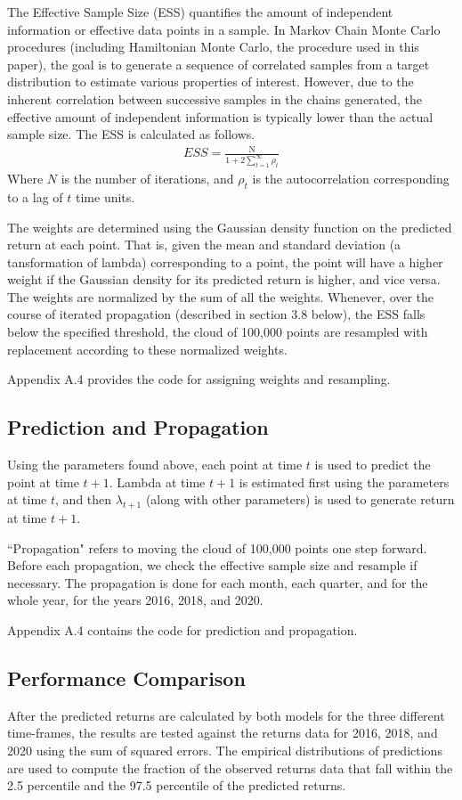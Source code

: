 \documentclass[12pt,letterpaper,reqno,fleqn]{article}
\begin{document}
The Effective Sample Size (ESS) quantifies the amount of independent information or effective data points in a sample. In Markov Chain Monte Carlo procedures (including Hamiltonian Monte Carlo, the procedure used in this paper), the goal is to generate a sequence of correlated samples from a target distribution to estimate various properties of interest. However, due to the inherent correlation between successive samples in the chains generated, the effective amount of independent information is typically lower than the actual sample size. The ESS is calculated as follows. 
\begin{align}
ESS = \frac{\text{N}}{1 + 2\sum_{t=1}^{\infty}\rho_t}
\end{align}
Where $N$ is the number of iterations, and $\rho_t$ is the autocorrelation corresponding to a lag of $t$ time units.

The weights are determined using the Gaussian density function on the predicted return at each point. That is, given the mean and standard deviation (a tansformation of lambda) corresponding to a point, the point will have a higher weight if the Gaussian density for its predicted return is higher, and vice versa. The weights are normalized by the sum of all the weights. Whenever, over the course of iterated propagation (described in section 3.8 below), the ESS falls below the specified threshold, the cloud of 100,000 points are resampled with replacement according to these normalized weights. 

Appendix A.4 provides the code for assigning weights and resampling.

\subsection{Prediction and Propagation}
Using the parameters found above, each point at time $t$ is used to predict the point at time $t+1$. Lambda at time $t+1$ is estimated first using the parameters at time $t$, and then $\lambda_{t+1}$ (along with other parameters) is used to generate return at time $t+1$. 

``Propagation" refers to moving the cloud of 100,000 points one step forward. Before each propagation, we check the effective sample size and resample if necessary. The  propagation is done for each month, each quarter, and for the whole year, for the years 2016, 2018, and 2020. 

Appendix A.4 contains the code for prediction and propagation.

\subsection{Performance Comparison}
After the predicted returns are calculated by both models for the three different time-frames, the results are tested against the returns data for 2016, 2018, and 2020 using the sum of squared errors. The empirical distributions of predictions are used to compute the fraction of the observed returns data that fall within the 2.5 percentile and the 97.5 percentile of the predicted returns.  
\end{document}
